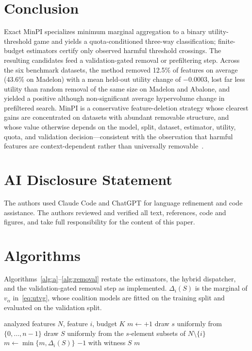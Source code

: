 \documentclass{article}
\begin{document}
\section{Conclusion}

Exact MinPI specializes minimum marginal aggregation to a binary utility-threshold game and yields a quota-conditioned three-way classification; finite-budget estimators certify only observed harmful threshold crossings. The resulting candidates feed a validation-gated removal or prefiltering step. Across the six benchmark datasets, the method removed 12.5\% of features on average (43.6\% on Madelon) with a mean held-out utility change of $-0.0003$, lost far less utility than random removal of the same size on Madelon and Abalone, and yielded a positive although non-significant average hypervolume change in prefiltered search. MinPI is a conservative feature-deletion strategy whose clearest gains are concentrated on datasets with abundant removable structure, and whose value otherwise depends on the model, split, dataset, estimator, utility, quota, and validation decision---consistent with the observation that harmful features are context-dependent rather than universally removable~\citep{lippl2024inductive}.

{
\section*{AI Disclosure Statement}
The authors used Claude Code and ChatGPT for language refinement and code assistance. The authors reviewed and verified all text, references, code and figures, and take full responsibility for the content of this paper.
}




\appendix

\section{Algorithms}
\label{app:algorithms}

{Algorithms~\ref{alg:a}--\ref{alg:removal} restate the estimators, the hybrid dispatcher, and the validation-gated removal step as implemented. $\Delta_i(S)$ is the marginal of $v_\alpha$ in~\eqref{eq:utvg}, whose coalition models are fitted on the training split and evaluated on the validation split.}

\begin{algorithm}[htbp]
\caption{Size-uniform coalition sampling for feature $i$ (Algorithm A)}
\label{alg:a}
\begin{algorithmic}[1]
\Require analyzed features $N$, feature $i$, budget $K$
\State $m\gets+1$
\State draw $s$ uniformly from $\{0,\ldots,n-1\}$
\State draw $S$ uniformly from the $s$-element subsets of $N\setminus\{i\}$
\State $m\gets\min\{m,\Delta_i(S)\}$
 \Return $-1$ with witness $S$ \EndIf
\EndFor
\State \Return $m$
\end{algorithmic}
\end{algorithm}
\end{document}
